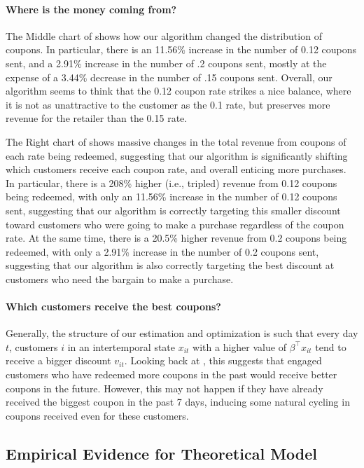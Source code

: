 \documentclass[format=acmsmall, review=false]{acmart}
\begin{document}
\paragraph{Where is the money coming from?}
The Middle chart of  shows how our algorithm changed the distribution of coupons.  In particular, there is an 11.56\% increase in the number of 0.12 coupons sent, and a 2.91\% increase in the number of .2 coupons sent, mostly at the expense of a 3.44\% decrease in the number of .15 coupons sent.
Overall, our algorithm seems to think that the 0.12 coupon rate strikes a nice balance, where it is not as unattractive to the customer as the 0.1 rate, but preserves more revenue for the retailer than the 0.15 rate.

The Right chart of  shows massive changes in the total revenue from coupons of each rate being redeemed, suggesting that our algorithm is significantly shifting which customers receive each coupon rate, and overall enticing more purchases.  In particular, there is a 208\% higher (i.e., tripled) revenue from 0.12 coupons being redeemed, with only an 11.56\% increase in the number of 0.12 coupons sent, suggesting that our algorithm is correctly targeting this smaller discount toward customers who were going to make a purchase regardless of the coupon rate.
At the same time, there is a 20.5\% higher revenue from 0.2 coupons being redeemed, with only a 2.91\% increase in the number of 0.2 coupons sent, suggesting that our algorithm is also correctly targeting the best discount at customers who need the bargain to make a purchase.

\paragraph{Which customers receive the best coupons?}
Generally, the structure of our estimation and optimization is such that every day $t$, customers $i$ in an intertemporal state $x_{it}$ with a higher value of $\beta^\top x_{it}$ tend to receive a bigger discount $v_{it}$.  Looking back at , this suggests that engaged customers who have redeemed more coupons in the past would receive better coupons in the future.  However, this may not happen if they have already received the biggest coupon in the past 7 days, inducing some natural cycling in coupons received even for these customers.


\subsection{Empirical Evidence for Theoretical Model} \label{sec:empEvid}
\end{document}
